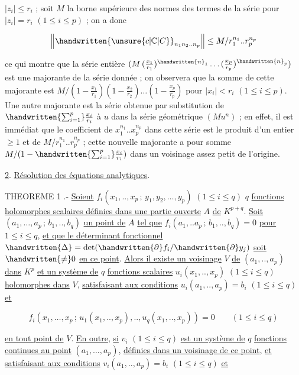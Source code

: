
$|z_i|\leq r_i$ ; soit $M$ la borne supérieure des normes des termes de la série pour $|z_i|=r_i$ $(1\leq i\leq p)$ ; on a donc

\[
\left\|\handwritten{\unsure{c|\mathbb C|C}}_{n_1n_2..n_p}\right\|\leq M/r_1^{n_1}..r_p^{n_p}
\]

ce qui montre que la série entière $(M\,(\frac{x_1}{r_1})^{\handwritten{n}_1}\ldots(\frac{x_p}{r_p})^{\handwritten{n}_p})$ est une majorante de la série donnée ; on observera que la somme de cette majorante est $M/(1-\frac{x_1}{r_1})(1-\frac{x_2}{r_2})\ldots(1-\frac{x_p}{r_p})$ pour $|x_i|<r_i$ $(1\leq i\leq p)$. Une autre majorante est la série obtenue par substitution de $\handwritten{\sum_{i=1}^p}\frac{x_i}{r_i}$ à $u$ dans la série géométrique $(Mu^n)$ ; en effet, il est immédiat que le coefficient de $x_1^{n_1}..x_p^{n_p}$ dans cette série est le produit d'un entier $\geq1$ et de $M/r_1^{n_1}..r_p^{n_p}$ ; cette nouvelle majorante a pour somme $M/(1-\handwritten{\sum_{i=1}^p}\frac{x_i}{r_i})$ dans un voisinage assez petit de l'origine.

\uline{2}. \uline{Résolution des équations analytiques}.

THEOREME 1 .- \uline{Soient} $f_i(x_1,..,x_p\,;\,y_1,y_2,\ldots,y_p)$ $(1\leq i\leq q)$ $q$ \uline{fonctions holomorphes scalaires définies dans une partie ouverte} $A$ \uline{de} $K^{p+q}$. \uline{Soit} $(a_1,\ldots,a_p\,;\,b_1,..,b_q)$ \uline{un point de} $A$ \uline{tel que} $f_i(a_1,..a_p\,;\,b_1,..,b_q)=0$ \uline{pour} $1\leq i\leq q$, \uline{et que le déterminant fonctionnel} $\handwritten{\Delta}=\det(\handwritten{\partial} f_i/\handwritten{\partial} y_j)$ \uline{soit} $\handwritten{\ne}0$ \uline{en ce point}. \uline{Alors il existe un voisinage} $V$ \uline{de} $(a_1,..,a_p)$ \uline{dans} $K^p$ \uline{et un système de} $q$ \uline{fonctions scalaires} $u_i(x_1,..,x_p)$ $(1\leq i\leq q)$ \uline{holomorphes dans} $V$, \uline{satisfaisant aux conditions} $u_i(a_1,..,a_p)=b_i$ $(1\leq i\leq q)$ \uline{et}

\[
f_i(x_1,\ldots,x_p\,;\,u_1(x_1,..,x_p),..,u_q(x_1,..,x_p))=0\qquad(1\leq i\leq q)\tag*{(1)}
\]

\uline{en tout point de} $V$. \uline{En outre}, \uline{si} $v_i$ $(1\leq i\leq q)$ \uline{est un système de} $q$ \uline{fonctions continues au point} $(a_1,\ldots,a_p)$, \uline{définies dans un voisinage de ce point}, \uline{et satisfaisant aux conditions} $v_i(a_1,..,a_p)=b_i$ $(1\leq i\leq q)$ \uline{et}







